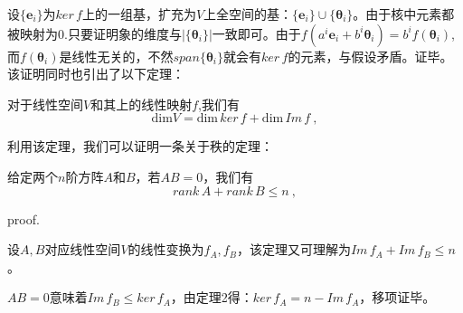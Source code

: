 设$\{\boldsymbol e_i\}$为$ker\,f$上的一组基，扩充为$V$上全空间的基：$\{\boldsymbol e_i\}\cup \{\boldsymbol \theta_i\}$。由于核中元素都被映射为0.只要证明象的维度与$|\{\boldsymbol \theta_i\}|$一致即可。由于$f(a^i\boldsymbol e_i+b^i\boldsymbol \theta_i)=b^if(\boldsymbol \theta_i)$,而$f(\boldsymbol \theta_i)$是线性无关的，不然$span\{\boldsymbol \theta_i\}$就会有$ker\,f$的元素，与假设矛盾。证毕。
该证明同时也引出了以下定理：
\begin{lemma}{}
对于线性空间$V$和其上的线性映射$f$,我们有
$$\mathrm{dim}V=\mathrm{dim}\,ker\,f+\mathrm {dim}\,Im\,f~,$$
\end{lemma}
利用该定理，我们可以证明一条关于秩的定理：
\begin{theorem}{}
给定两个$n$阶方阵$A$和$B$，若$AB=0$，我们有
\begin{equation}
rank\,A+rank\,B\le n~,
\end{equation}
\end{theorem}
proof.

设$A,B$对应线性空间$V$的线性变换为$f_A,f_B$，该定理又可理解为$Im\,f_A+Im\,f_B\le n$。

$AB=0$意味着$Im\,f_B\le ker\,f_A$，由定理2得：$ker\,f_A=n-Im\,f_A$，移项证毕。
